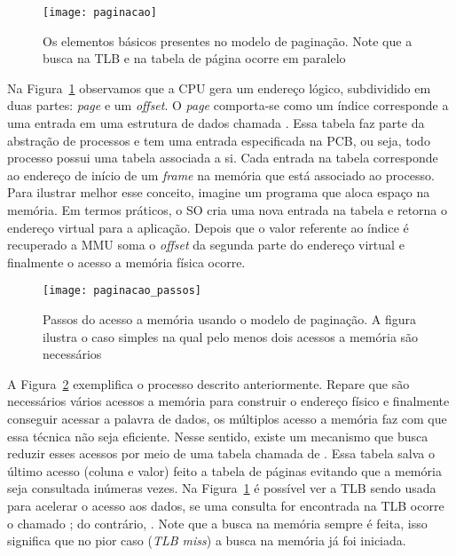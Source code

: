 \begin{figure}[!h]
  \centering
  \texttt{[image: paginacao]} 
  \caption{Os elementos básicos presentes no modelo de paginação. Note que a busca na TLB e na tabela de página ocorre em paralelo}
  \label{fig:paginacao}
\end{figure}

Na Figura~\ref{fig:paginacao} observamos que a CPU gera um endereço lógico,
subdividido em duas partes: \textit{page} e um \textit{offset}. O \emph{page}
comporta-se como um índice corresponde a uma entrada em uma estrutura de dados
chamada . Essa tabela faz parte da abstração
de processos e tem uma entrada especificada na PCB, ou seja, todo processo
possui uma tabela associada a si. Cada entrada na tabela corresponde ao
endereço de início de um \emph{frame} na memória que está associado ao
processo.  Para ilustrar melhor esse conceito, imagine um programa que aloca
espaço na memória. Em termos práticos, o SO cria uma nova entrada na tabela e
retorna o endereço virtual para a aplicação.  Depois que o valor referente ao
índice é recuperado a MMU soma o \textit{offset} da segunda parte do endereço
virtual e finalmente o acesso a memória física ocorre.

\begin{figure}[!h]
  \centering
  \texttt{[image: paginacao\_passos]} 
  \caption{Passos do acesso a memória usando o modelo de paginação. A figura ilustra o caso simples na qual pelo menos dois acessos a memória são necessários}
  \label{fig:passos_paginacao}
\end{figure}

A Figura~\ref{fig:passos_paginacao} exemplifica o processo descrito
anteriormente. Repare que são necessários vários acessos a memória para
construir o endereço físico e finalmente conseguir acessar a palavra de dados,
os múltiplos acesso a memória faz com que essa técnica não seja eficiente.
Nesse sentido, existe um mecanismo que busca reduzir esses acessos por meio de
uma tabela chamada de . Essa
tabela salva o último acesso (coluna e valor) feito a tabela de páginas
evitando que a memória seja consultada inúmeras vezes. Na
Figura~\ref{fig:paginacao} é possível ver a TLB sendo usada para acelerar o
acesso aos dados, se uma consulta for encontrada na TLB ocorre o chamado
; do contrário, . Note que a busca na memória sempre é feita, isso significa que
no pior caso (\emph{TLB miss}) a busca na memória já foi iniciada.

